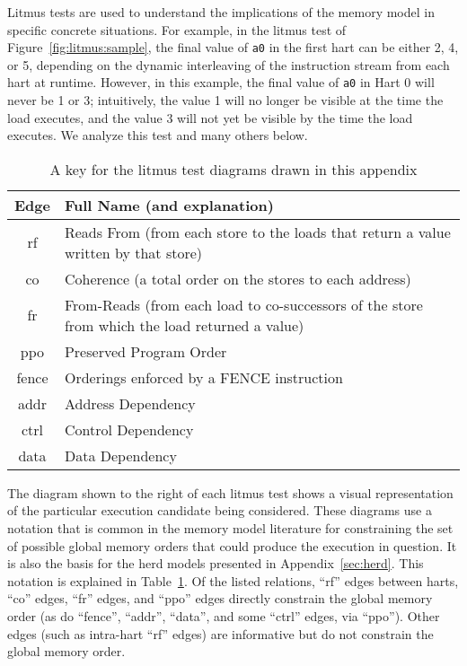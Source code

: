 Litmus tests are used to understand the implications of the memory model in specific concrete situations.
For example, in the litmus test of Figure~\ref{fig:litmus:sample}, the final value of {\tt a0} in the first hart can be either 2, 4, or 5, depending on the dynamic interleaving of the instruction stream from each hart at runtime.
However, in this example, the final value of {\tt a0} in Hart 0 will never be 1 or 3; intuitively, the value 1 will no longer be visible at the time the load executes, and the value 3 will not yet be visible by the time the load executes.
We analyze this test and many others below.

\begin{table}[h]
  \centering\small
  \begin{tabular}{|c|l|}
    \hline
    Edge & Full Name (and explanation) \\
    \hline
    \sf rf   & Reads From (from each store to the loads that return a value written by that store) \\
    \hline
    \sf co   & Coherence (a total order on the stores to each address) \\
    \hline
    \sf fr   & From-Reads (from each load to co-successors of the store from which the load returned a value) \\
    \hline
    \sf ppo  & Preserved Program Order \\
    \hline
    \sf fence & Orderings enforced by a FENCE instruction \\
    \hline
    \sf addr & Address Dependency \\
    \hline
    \sf ctrl & Control Dependency \\
    \hline
    \sf data & Data Dependency \\
    \hline
  \end{tabular}
  \caption{A key for the litmus test diagrams drawn in this appendix}
  \label{tab:litmus:key}
\end{table}

The diagram shown to the right of each litmus test shows a visual representation of the particular execution candidate being considered.
These diagrams use a notation that is common in the memory model literature for constraining the set of possible global memory orders that could produce the execution in question.
It is also the basis for the \textsf{herd} models presented in Appendix~\ref{sec:herd}.
This notation is explained in Table~\ref{tab:litmus:key}.
Of the listed relations, ``rf'' edges between harts, ``co'' edges, ``fr'' edges, and ``ppo'' edges directly constrain the global memory order (as do ``fence'', ``addr'', ``data'', and some ``ctrl'' edges, via ``ppo'').
Other edges (such as intra-hart ``rf'' edges) are informative but do not constrain the global memory order.

